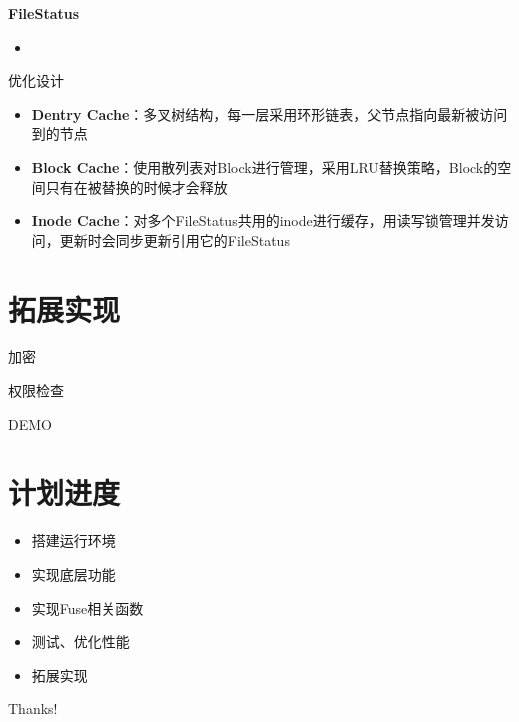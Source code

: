 \documentclass{beamer}
\begin{document}
\begin{frame}{\textbf{FileStatus}}
\begin{itemize}[<+-| alert@+>]
    \item 
\end{itemize}
\end{frame}

\begin{frame}{优化设计}
\begin{itemize}[<+-| alert@+>]
    \item \textbf{Dentry Cache}：多叉树结构，每一层采用环形链表，父节点指向最新被访问到的节点
    \item \textbf{Block Cache}：使用散列表对Block进行管理，采用LRU替换策略，Block的空间只有在被替换的时候才会释放
    \item \textbf{Inode Cache}：对多个FileStatus共用的inode进行缓存，用读写锁管理并发访问，更新时会同步更新引用它的FileStatus
\end{itemize}
\end{frame}

\section{拓展实现}

\begin{frame}{加密}

\end{frame}

\begin{frame}{权限检查}

\end{frame}

\begin{frame}
    \begin{center}
        {\Huge DEMO}
    \end{center}
\end{frame}

\section{计划进度}
\begin{frame}
    \begin{itemize}
        \item 搭建运行环境
        \item 实现底层功能
        \item 实现Fuse相关函数
        \item 测试、优化性能
        \item 拓展实现
    \end{itemize}
\end{frame}

\begin{frame}
    \begin{center}
        {\Huge\calligra Thanks!}
    \end{center}
\end{frame}
\end{document}
